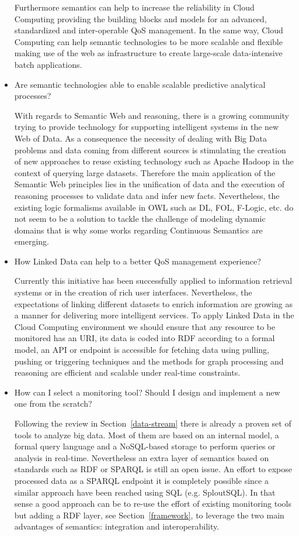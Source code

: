 \begin{itemize}
Furthermore semantics can help to increase the reliability in Cloud Computing providing the 
building blocks and models for an advanced, standardized and inter-operable QoS management. 
In the same way, Cloud Computing can help semantic technologies to be more scalable and flexible making use of the web as 
infrastructure to create large-scale data-intensive batch applications.


\item Are semantic technologies able to enable scalable predictive analytical processes?

With regards to Semantic Web and reasoning, there is a growing community 
trying to provide technology for supporting intelligent systems in the new Web 
of Data. As a consequence the necessity of dealing with Big Data problems and 
data coming from different sources is stimulating the creation of new approaches 
to reuse existing technology such as Apache Hadoop in the context of querying 
large datasets. Therefore the main application of the Semantic Web principles 
lies in the unification of data and the execution of reasoning processes to 
validate data and infer new facts. Nevertheless, the existing logic formalisms 
available in OWL such as DL, FOL, F-Logic, etc. do not seem to be a solution to 
tackle the challenge of modeling dynamic domains that is why some works 
regarding Continuous Semantics are emerging.

\item How Linked Data can help to a better QoS management experience?

Currently this initiative has been successfully applied to 
information retrieval systems or in the creation of rich user interfaces. 
Nevertheless, the expectations of linking different datasets to enrich 
information are growing as a manner for delivering more intelligent services. To 
apply Linked Data in the Cloud Computing environment we should ensure that any 
resource to be monitored has an URI, its data is coded into RDF according to a 
formal model, an API or endpoint is accessible for fetching data using pulling, 
pushing or triggering techniques and the methods for graph processing and 
reasoning are efficient and scalable under real-time constraints.

\item How can I select a monitoring tool? Should I design and implement a new one from the scratch?

Following the review in Section~\ref{data-stream} there is already a proven set of tools to analyze 
big data. Most of them are based on an internal model, a formal query language and a NoSQL-based storage 
to perform queries or analysis in real-time. Nevertheless an extra layer of semantics based on standards 
such as RDF or SPARQL is still an open issue. An effort to expose processed data as a SPARQL endpoint it is 
completely possible since a similar approach have been reached using SQL (e.g. SploutSQL). In that sense a good approach can 
be to re-use the effort of existing monitoring tools but adding a RDF layer, see Section~\ref{framework}, 
to leverage the two main advantages of semantics: integration and interoperability.


\end{itemize}

